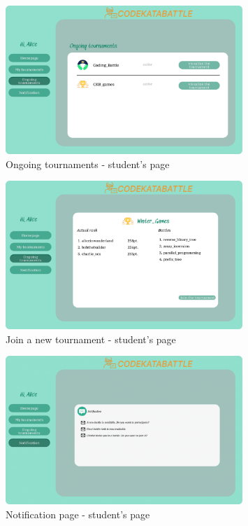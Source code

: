 \begin{figure}[H]
    \centering
    \includegraphics[width=0.8\textwidth]{images/user_interface/UI_sw2-06.png}
    \caption{Ongoing tournaments - student's page}
\end{figure}

\begin{figure}[H]
    \centering
    \includegraphics[width=0.8\textwidth]{images/user_interface/UI_sw2-07.png}
    \caption{Join a new tournament - student's page}
\end{figure}

\begin{figure}[H]
    \centering
    \includegraphics[width=0.8\textwidth]{images/user_interface/UI_sw2-08.png}
    \caption{Notification page - student's page}
\end{figure}

